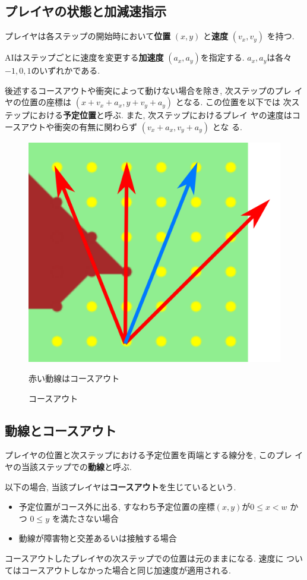 \documentclass[11pt]{jarticle}
\begin{document}
\subsection{プレイヤの状態と加減速指示}
プレイヤは各ステップの開始時において{\bf 位置} $(x, y)$ と{\bf 速度}
$(v_x, v_y)$ を持つ.

AIはステップごとに速度を変更する{\bf 加速度} $(a_x, a_y)$を指定する.
$a_x, a_y$は各々$-1, 0, 1$のいずれかである.

後述するコースアウトや衝突によって動けない場合を除き, 次ステップのプレ
イヤの位置の座標は $(x+v_x+a_x, y+v_y+a_y)$ となる. この位置を以下では
次ステップにおける{\bf 予定位置}と呼ぶ. また, 次ステップにおけるプレイ
ヤの速度はコースアウトや衝突の有無に関わらず $(v_x+a_x, v_y+a_y)$ とな
る.

\begin{figure}
  \vspace{-1cm}
  \centering
  \includegraphics[width=0.26\columnwidth, natwidth=1358, natheight=1181]{courseout.png}
  \caption{コースアウト}
  \label{fig:courseout}
  赤い動線はコースアウト
  \vspace{-1cm}
\end{figure}

\subsection{動線とコースアウト}

プレイヤの位置と次ステップにおける予定位置を両端とする線分を, このプレ
イヤの当該ステップでの{\bf 動線}と呼ぶ.

以下の場合, 当該プレイヤは{\bf コースアウト}を生じているという.
\begin{itemize}
\item
  予定位置がコース外に出る, すなわち予定位置の座標$(x,y)$が$0 \le x <
  w$ かつ $0 \le y$ を満たさない場合
\item
  動線が障害物と交差あるいは接触する場合
\end{itemize}
コースアウトしたプレイヤの次ステップでの位置は元のままになる.  速度に
ついてはコースアウトしなかった場合と同じ加速度が適用される.
\end{document}
